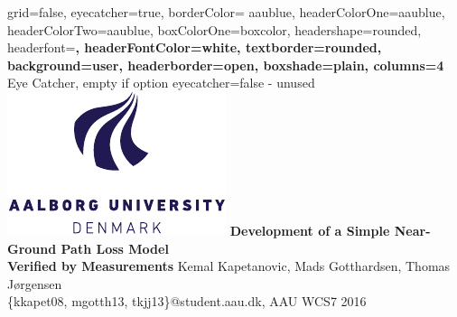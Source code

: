 \documentclass[a0paper,landscape]{baposter}
\begin{document}

\background{
}

\begin{poster}{
	grid=false,
	eyecatcher=true, 
	borderColor= aaublue,
	headerColorOne=aaublue,
	headerColorTwo=aaublue,
	boxColorOne=boxcolor,
	headershape=rounded,
	headerfont=\Large\sf\bf,
	headerFontColor=white,
	textborder=rounded,
	background=user,
	headerborder=open,
  	boxshade=plain,
  	columns=4
}
{
	Eye Catcher, empty if option eyecatcher=false - unused
	\hspace{1cm} \includegraphics[scale=0.9]{aau_logo_new}
}
{\sf\bf
	\hspace{-2.2em}Development of a Simple Near-Ground Path Loss Model \\Verified by Measurements
}
{
	 Kemal Kapetanovic, Mads Gotthardsen, Thomas Jørgensen \\
	\smaller \{kkapet08, mgotth13, tkjj13\}@student.aau.dk, AAU WCS7 2016
}
{
}
\end{poster}
\end{document}
